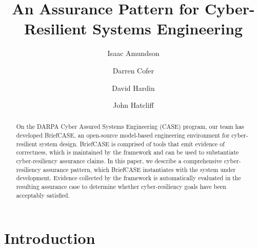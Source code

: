 \documentclass[runningheads]{llncs}
\begin{document}
\title{An Assurance Pattern for Cyber-Resilient Systems Engineering}

\author{
	Isaac Amundson 
	\and Darren Cofer 
	\and David Hardin 
	\and John Hatcliff}



\maketitle

\begin{abstract}

On the DARPA Cyber Assured Systems Engineering (CASE) program, our team has developed BriefCASE, an open-source model-based engineering environment for cyber-resilient system design.  BriefCASE is comprised of tools that emit evidence of correctness, which is maintained by the framework and can be used to substantiate cyber-resiliency assurance claims.  
In this paper, we describe a comprehensive cyber-resiliency assurance pattern, which BriefCASE instantiates with the system under development. Evidence collected by the framework is automatically evaluated in the resulting assurance case to determine whether cyber-resiliency goals have been acceptably satisfied.

\end{abstract}


\section{Introduction}
\label{sec:introduction}





%
\end{document}
